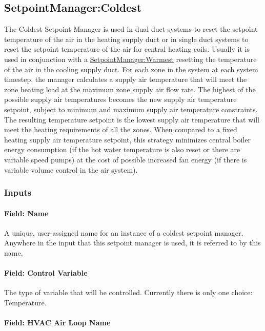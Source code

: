 \subsection{SetpointManager:Coldest}\label{setpointmanagercoldest}

The Coldest Setpoint Manager is used in dual duct systems to reset the setpoint temperature of the air in the heating supply duct or in single duct systems to reset the setpoint temperature of the air for central heating coils. Usually it is used in conjunction with a \hyperref[setpointmanagerwarmest]{SetpointManager:Warmest} resetting the temperature of the air in the cooling supply duct. For each zone in the system at each system timestep, the manager calculates a supply air temperature that will meet the zone heating load at the maximum zone supply air flow rate. The highest of the possible supply air temperatures becomes the new supply air temperature setpoint, subject to minimum and maximum supply air temperature constraints. The resulting temperature setpoint is the lowest supply air temperature that will meet the heating requirements of all the zones. When compared to a fixed heating supply air temperature setpoint, this strategy minimizes central boiler energy consumption (if the hot water temperature is also reset or there are variable speed pumps) at the cost of possible increased fan energy (if there is variable volume control in the air system).

\subsubsection{Inputs}\label{inputs-11-017}

\paragraph{Field: Name}\label{field-name-11-013}

A unique, user-assigned name for an instance of a coldest setpoint manager. Anywhere in the input that this setpoint manager is used, it is referred to by this name.

\paragraph{Field: Control Variable}\label{field-control-variable-11}

The type of variable that will be controlled. Currently there is only one choice: Temperature.

\paragraph{Field: HVAC Air Loop Name}\label{field-hvac-air-loop-name-1}

